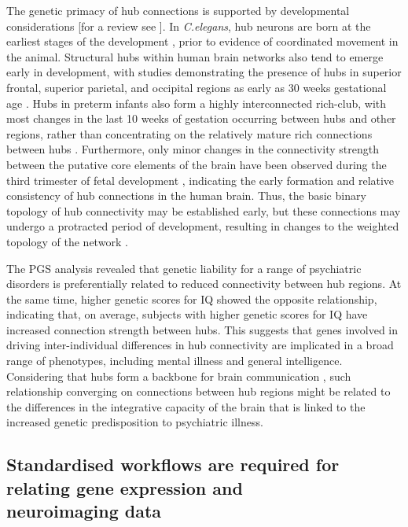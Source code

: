 The genetic primacy of hub connections is supported by developmental considerations [for a review see \citep{Oldham2018}]. In \textit{C.elegans}, hub neurons are born at the earliest stages of the development \citep{Varier2011}, prior to evidence of coordinated movement in the animal. Structural hubs within  human brain networks also tend to emerge early in development, with studies demonstrating the presence of hubs in superior frontal, superior parietal, and occipital regions as early as 30 weeks gestational age \citep{Ball2014}. Hubs in preterm infants also form a highly interconnected rich-club, with most changes in the last 10 weeks of gestation occurring between hubs and other regions, rather than concentrating on the relatively mature rich connections between hubs \citep{Ball2014}. Furthermore, only minor changes in the connectivity strength between the putative core elements of the brain have been observed during the third trimester of fetal development \citep{Batalle2017}, indicating the early formation and relative consistency of hub connections in the human brain. Thus, the basic binary topology of hub connectivity may be established early, but these connections may undergo a protracted period of development, resulting in changes to the weighted topology of the network \citep{Baker2015a,Oldham2018}.

The PGS analysis revealed that genetic liability for a range of psychiatric disorders is preferentially related to reduced connectivity between hub regions. At the same time, higher genetic scores for IQ showed the opposite relationship, indicating that, on average, subjects with higher genetic scores for IQ have increased connection strength between hubs. This suggests that genes involved in driving inter-individual differences in hub connectivity are implicated in a broad range of phenotypes, including mental illness and general intelligence.
Considering that hubs form a backbone for brain communication \citep{Harriger2012, VandenHeuvel2011,VandenHeuvel2013b}, such relationship converging on connections between hub regions might be related to the differences in the integrative capacity of the brain that is linked to the increased genetic predisposition to psychiatric illness.

\subsection*{Standardised workflows are required for relating gene expression and \\neuroimaging data}

